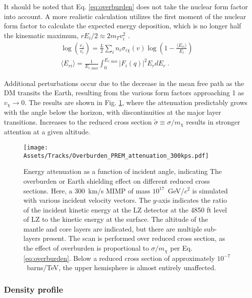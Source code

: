 It should be noted that Eq. \ref{eq:overburden} does not take the nuclear form factor into account. 
A more realistic calculation utilizes the first moment of the nuclear form factor to calculate the expected energy deposition, which is no longer half the kinematic maximum,  $rE_i /2 \approx 2 m_T v_i^2$
. 
\begin{align}
     \log(\frac{v_f}{v_i}) = \frac{L}{2} \sum_i n_i \sigma_{i \chi}(v) \log (1- \frac{\langle E_{ri} \rangle}{E_i})\\
     \langle E_{ri} \rangle = \frac{1}{E_{r,\text{max}}}\int_0^ {E_{r,\text{max}}} |F_i(q)|^2 E_r dE_r~.
\end{align}

Additional perturbations occur due to the decrease in the mean free path as the DM transits the Earth, resulting from the various form factors approaching 1 as $v_\chi\rightarrow0$.
The results are shown in Fig. \ref{fig:overburden_attenuation}, where the attenuation predictably grows with the angle below the horizon, with discontinuities at the major layer transitions.
Increases to the reduced cross section $\tilde \sigma \equiv \sigma / m_\chi$ results in stronger attention at a given altitude.



\begin{figure}
    \centering
    \texttt{[image: Assets/Tracks/Overburden\_PREM\_attenuation\_300kps.pdf]}
    \caption[Energy attenuation as a function of incident angle, indicating The overburden or Earth shielding effect on different reduced cross sections.]%
    {Energy attenuation as a function of incident angle, indicating The overburden or Earth shielding effect on different reduced cross sections.
    Here, a 300~km/s MIMP of mass $10^{17}$~GeV/$c^2$ is simulated with various incident velocity vectors.
    The $y$-axis indicates the ratio of the incident kinetic energy at the LZ detector at the 4850 ft level of LZ to the kinetic energy at the surface.
    The altitude of the mantle and core layers are indicated, but there are multiple sub-layers present.
    The scan is performed over reduced cross section, as the effect of overburden is proportional to $\sigma/m_\chi$ per Eq. \ref{eq:overburden}.
    Below a reduced cross section of approximately $10^{-7}$~barns/TeV, the upper hemisphere is almost entirely unaffected.}
    \label{fig:overburden_attenuation}
\end{figure}
\subsubsection{ Density profile }

